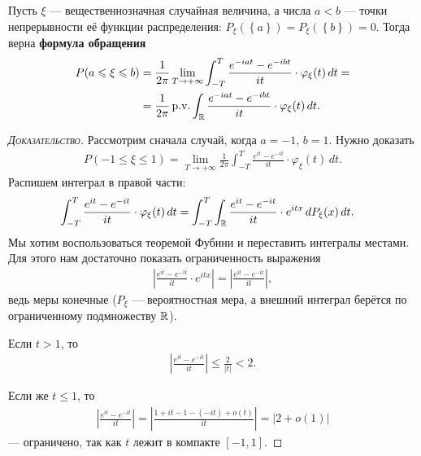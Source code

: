 \documentclass[../main.tex]{subfiles}
\begin{document}
\begin{thm}
 \label{theorem:inversing_formula}
 Пусть $ \xi $ --- вещественнозначная случайная величина, а числа $ a < b $ --- точки непрерывности её функции распределения: $ P_\xi(\left\{ a \right\}) = P_\xi(\left\{ b \right\}) = 0 $. Тогда верна \textbf{формула обращения}
 \begin{align*}
  P(a \leqslant \xi \leqslant b) &= \frac{1}{2\pi} \lim_{T \to +\infty} \int_{-T}^{T}  \frac{e^{-iat}-e^{-ibt}}{it} \cdot \varphi_\xi(t)\,dt = \\
  &= \frac{1}{2\pi} \operatorname{p.\!v.} \int_{\mathbb{R}} \frac{e^{-iat}-e^{-ibt}}{it}\cdot\varphi_\xi(t)\,dt.
 \end{align*}
\end{thm}
\begin{proof}[\normalfont\textsc{Доказательство}]
 Рассмотрим сначала случай, когда $ a = -1 $, $ b = 1 $. Нужно доказать
 \begin{align*}
  P(-1 \leqslant \xi \leqslant 1) = \lim_{T \to +\infty} \frac{1}{2\pi}\int_{-T}^{T} \frac{e^{it}-e^{-it}}{it}\cdot\varphi_\xi(t)\,dt.
 \end{align*} Распишем интеграл в правой части:
 \begin{align*}
  \int_{-T}^{T} \frac{e^{it}-e^{-it}}{it}\cdot\varphi_\xi(t)\,dt &= \int_{-T}^{T} \int_\mathbb{R} \frac{e^{it}-e^{-it}}{it} \cdot e^{itx}\,dP_\xi(x)\,dt.
 \end{align*} Мы хотим воспользоваться теоремой Фубини и переставить интегралы местами. Для этого нам достаточно показать ограниченность выражения
 \begin{align*}
  \left| \frac{e^{it}-e^{-it}}{it} \cdot e^{itx} \right| = \left| \frac{e^{it}-e^{-it}}{it} \right|,
 \end{align*} ведь меры конечные ($ P_\xi $ --- вероятностная мера, а внешний интеграл берётся по ограниченному подмножеству $ \mathbb{R} $). 

 Если $ t > 1 $, то
 \begin{align*}
  \left| \frac{e^{it}-e^{-it}}{it} \right| \leqslant \frac{2}{\left| t \right|} < 2.
 \end{align*} 

 Если же $ t \leqslant 1 $, то
 \begin{align*}
  \left| \frac{e^{it}-e^{-it}}{it} \right| = \left| \frac{1 + it - 1 - (-it) + o(t)}{it} \right| = \left| 2 + o(1) \right|
 \end{align*} --- ограничено, так как $ t $ лежит в компакте  $ [-1,1] $.


\end{proof}
\end{document}
